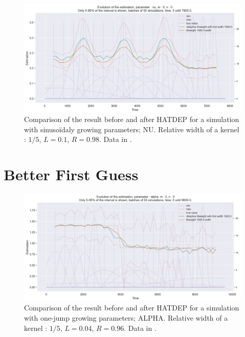 \begin{figure}
\centering
\includegraphics[width = 0.90 \textwidth]{../imag/chap3/4/O.png}
\caption{Comparison of the result before and after HATDEP for a simulation with sinusoïdaly growing parameters; NU. Relative width of a kernel : $1/5$, $L = 0.1$, $R = 0.98$. Data in \protect {}.}
\label{fig:first_estimate_4_nu}
\end{figure}



































\newpage
\section{Better First Guess}



\begin{figure}
\centering
\includegraphics[width = 0.90 \textwidth]{../imag/chap3/2_bis/P.png}
\caption{Comparison of the result before and after HATDEP for a simulation with one-jump growing parameters; ALPHA. Relative width of a kernel : $1/5$, $L = 0.04$, $R = 0.96$. Data in \protect {}.}
\label{fig:second_estimate_2_alpha}
\end{figure}


